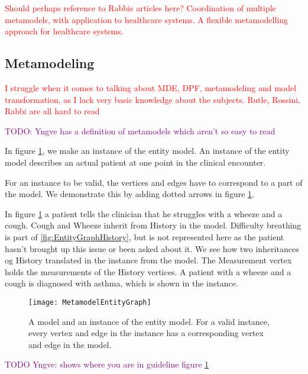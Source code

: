 \textcolor{red}{Should perhaps reference to Rabbis articles here? 
	Coordination	of multiple metamodels, with application	to healthcare systems.
A flexible metamodelling approach for healthcare systems. }

\subsection{Metamodeling}

\textcolor{red}{I struggle when it comes to talking about MDE, DPF, metamodeling and model transformation, as I lack very basic knowledge about the subjects. Rutle, Rossini, Rabbi are all hard to read}

\textcolor{purple}{TODO: Yngve has a definition of metamodels which aren't so easy to read}

In figure \ref{fig:MetamodelEntityGraph}, we make an instance of the entity model. An instance of the entity model describes an actual patient at one point in the clinical encounter. 

For an instance to be valid, the vertices and edges have to correspond to a part of the model. We demonstrate this by adding dotted arrows in figure \ref{fig:MetamodelEntityGraph}. 

In figure \ref{fig:MetamodelEntityGraph} a patient tells the clinician that he struggles with a wheeze and a cough. Cough and Wheeze inherit from History in the model. Difficulty breathing is part of \ref{fig:EntityGraphHistory}, but is not represented here as the patient hasn't brought up this issue or been asked about it. We see how two inheritances og History translated in the instance from the model. The Measurement vertex holds the measurements of the History vertices. A patient with a wheeze and a cough is diagnosed with asthma, which is shown in the instance.
\begin{figure}[h!]
	\caption {A model and an instance of the entity model. For a valid instance, every vertex and edge in the instance has a corresponding vertex and edge in the model.}
	\label{fig:MetamodelEntityGraph}
	\texttt{[image: MetamodelEntityGraph]}
\end{figure}
\textcolor{purple}{TODO Yngve: shows where you are in guideline figure \ref{fig:MetamodelEntityGraph}}

